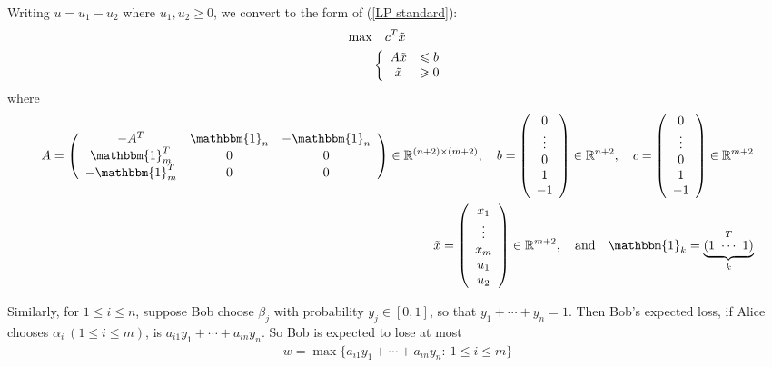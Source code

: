 Writing $u=u_1-u_2$ where $u_1, u_2\geqslant 0$, we convert to the form of (\ref{LP standard}):
\begin{align}
    \max & \quad c^T \Tilde{x} \nonumber \\
    & \left\lbrace\begin{array}{cc}
       A\Tilde{x}  &\leqslant b  \\
         \Tilde{x}&\geqslant 0 
    \end{array} \right.\label{2.4}
\end{align}
where
\begin{align*}
    A = \left(\begin{array}{ccc}
        -A^T & \mathbbm{1}_n & -\mathbbm{1}_n \\
        \mathbbm{1}_m^T & 0 & 0 \\
        -\mathbbm{1}_m^T & 0 & 0
    \end{array} \right)\in\mathbb{R}^{(n+2)\times(m+2)},\quad b = \left(\begin{array}{c}
         0  \\
         \vdots \\
         0 \\
         1 \\
         -1 
    \end{array} \right) \in\mathbb{R}^{n+2}, \quad c = \left(\begin{array}{c}
         0  \\
         \vdots \\
         0 \\
         1 \\
         -1 
    \end{array} \right) \in\mathbb{R}^{m+2} \\
    \Tilde{x} = \left(\begin{array}{c}
         x_1  \\
         \vdots \\
         x_m \\
         u_1 \\
         u_2 
    \end{array} \right) \in\mathbb{R}^{m+2}, \quad \text{and} \quad \mathbbm{1}_k = \underbrace{(1\ \cdots \ 1)}\limits_{k}^T
\end{align*}

Similarly, for $1\leqslant i\leqslant n$, suppose Bob choose $\beta_j$ with probability $y_j\in[0, 1]$, so that $y_1+\cdots + y_n = 1$. Then Bob's expected loss, if Alice chooses $\alpha_i\ (1\leqslant i\leqslant m)$, is $a_{i1}y_1 + \cdots + a_{in}y_n$. So Bob is expected to lose at most
\begin{align*}
    w = \max\{a_{i1}y_1 + \cdots + a_{in}y_n:\ 1\leqslant i\leqslant m\}
\end{align*}

